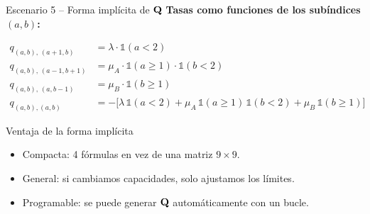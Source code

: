 \documentclass[aspectratio=1610, 9pt]{beamer}
\begin{document}
\begin{frame}{Escenario 5 -- Forma impl\'icita de $\mathbf{Q}$}
\textbf{Tasas como funciones de los sub\'indices $(a,b)$:}

\vspace{4pt}
\[
\boxed{
\begin{aligned}
q_{(a,b),\,(a+1,b)} &= \lambda \cdot \mathbb{1}(a < 2) \\[3pt]
q_{(a,b),\,(a-1,b+1)} &= \mu_A \cdot \mathbb{1}(a \ge 1) \cdot \mathbb{1}(b < 2) \\[3pt]
q_{(a,b),\,(a,b-1)} &= \mu_B \cdot \mathbb{1}(b \ge 1) \\[3pt]
q_{(a,b),(a,b)} &= -\big[\lambda\,\mathbb{1}(a{<}2) + \mu_A\,\mathbb{1}(a{\ge}1)\,\mathbb{1}(b{<}2) + \mu_B\,\mathbb{1}(b{\ge}1)\big]
\end{aligned}
}
\]

\vspace{6pt}
\begin{block}{Ventaja de la forma implícita}
\begin{itemize}
    \item Compacta: 4 f\'ormulas en vez de una matriz $9\times 9$.
    \item General: si cambiamos capacidades, solo ajustamos los l\'imites.
    \item Programable: se puede generar $\mathbf{Q}$ autom\'aticamente con un bucle.
\end{itemize}
\end{block}
\end{frame}
\end{document}
